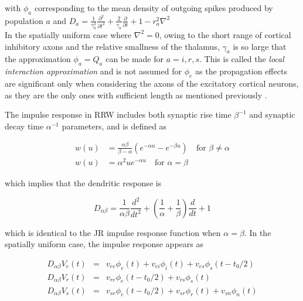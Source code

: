 \documentclass[12pt,twoside]{article}
\begin{document}
with $\phi_a$ corresponding to the mean density of outgoing spikes produced by population $a$ and $D_a=\frac{1}{\gamma_a^2} \frac{\partial^2}{\partial t^2}+ \frac{2}{\gamma_a} \frac{\partial}{\partial t} + 1- r_a^2 \nabla^2$ \\

In the spatially uniform case where $\nabla^2=0$, owing to the short range of cortical inhibitory axons and the relative smallness of the thalamus, $\gamma_a$ is so large that the approximation $\phi_a=Q_a$ can be made for $a=i,r,s$. This is called the \textit{local interaction approximation} and is not assumed for $\phi_e$ as the propagation effects are significant only when considering the axons of the excitatory cortical neurons, as they are the only ones with sufficient length as mentioned previously \citep{robinson2001prediction, robinson2002dynamics, sanz2017multistability}.

The impulse response in RRW includes both synaptic rise time $\beta^{-1}$ and synaptic decay time $\alpha^{-1}$ parameters, and is defined as

\begin{equation}
    \begin{aligned}
    w(u) &=\frac{\alpha \beta}{\beta - \alpha}(e^{-\alpha u} - e^{-\beta u}) \quad \text{for } \beta \neq \alpha \\
    w(u) &= \alpha ^{2}ue^{-\alpha u} \quad \text{for } \alpha = \beta
    \end{aligned}
\end{equation}

which implies that the dendritic response is

\begin{equation}
    D_{\alpha \beta} =  \frac{1}{\alpha \beta}  \frac{d^2}{dt^2}+\left(\frac{1}{\alpha}+\frac{1}{\beta}\right) \frac{d}{dt}+1
\end{equation}

which is identical to the JR impulse response function when $\alpha = \beta$. In the spatially uniform case, the impulse response appears as 

\begin{eqnarray}
    D_{\alpha \beta} V_e (t) &=& v_{ee} \phi_e (t)+v_{ei} \phi_i (t)+v_{es} \phi_s (t-t_0/2) \\
    D_{\alpha \beta} V_r (t) &=& v_{re} \phi_e (t-t_0 /2)+v_{rs} \phi_s (t) \\
    D_{\alpha \beta} V_s (t) &=& v_{se} \phi_e (t-t_0 /2)+v_{sr} \phi_r (t)+v_{sn} \phi_n (t)
\end{eqnarray}
\end{document}
